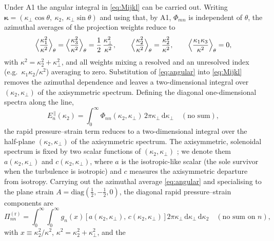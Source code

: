 \documentclass[lineno]{JFM-FLM_Au}
\begin{document}
Under A1 the angular integral in \eqref{eq:Mijkl} can be carried out. Writing
$\boldsymbol{\kappa}=(\kappa_\perp\cos\theta,\ \kappa_2,\
\kappa_\perp\sin\theta)$ and using that, by A1, $\Phi_{mn}$ is independent of
$\theta$, the azimuthal averages of the projection weights reduce to
\begin{equation}
  \Bigl\langle \frac{\kappa_1^2}{\kappa^2}\Bigr\rangle_\theta
  = \Bigl\langle \frac{\kappa_3^2}{\kappa^2}\Bigr\rangle_\theta
  = \frac{1}{2}\,\frac{\kappa_\perp^2}{\kappa^2},
  \qquad
  \Bigl\langle \frac{\kappa_2^2}{\kappa^2}\Bigr\rangle_\theta
  = \frac{\kappa_2^2}{\kappa^2},
  \qquad
  \Bigl\langle \frac{\kappa_1\kappa_3}{\kappa^2}\Bigr\rangle_\theta = 0,
  \label{eq:angular}
\end{equation}
with $\kappa^2=\kappa_2^2+\kappa_\perp^2$, and all weights mixing a resolved
and an unresolved index (e.g.\ $\kappa_1\kappa_2/\kappa^2$) averaging to zero.
Substitution of \eqref{eq:angular} into \eqref{eq:Mijkl} removes the azimuthal
dependence and leaves a two-dimensional integral over $(\kappa_2,\kappa_\perp)$
of the axisymmetric spectrum. Defining the diagonal one-dimensional spectra
along the line,
\begin{equation}
  E_n^{\,\|}(\kappa_2)
   = \int_0^\infty \Phi_{nn}(\kappa_2,\kappa_\perp)\,
     2\pi\kappa_\perp\,\mathrm{d}\kappa_\perp
   \quad(\text{no sum}),
   \label{eq:Epar}
\end{equation}
the rapid pressure--strain term reduces to a two-dimensional integral over the
half-plane $(\kappa_2,\kappa_\perp)$ of the axisymmetric spectrum. The
axisymmetric, solenoidal spectrum is fixed by two scalar functions of
$(\kappa_2,\kappa_\perp)$ \citep{Batchelor1946,ChandrasekharAxisym1950}; we
denote them $a(\kappa_2,\kappa_\perp)$ and $c(\kappa_2,\kappa_\perp)$, where
$a$ is the isotropic-like scalar (the sole survivor when the turbulence is
isotropic) and $c$ measures the axisymmetric departure from isotropy. Carrying
out the azimuthal average \eqref{eq:angular} and specialising to the plane
strain $A=\mathrm{diag}(\tfrac12,-\tfrac12,0)$, the diagonal rapid
pressure--strain components are
\begin{equation}
  \Pi^{(\mathrm r)}_{nn}
  = \int_{0}^{\infty}\!\!\int_{0}^{\infty}
      g_{n}(x)\,\bigl[\,a(\kappa_2,\kappa_\perp),\,c(\kappa_2,\kappa_\perp)\,\bigr]\,
      2\pi\kappa_\perp\,\mathrm{d}\kappa_\perp\,\mathrm{d}\kappa_2
   \quad(\text{no sum on }n),
  \label{eq:Piclosed}
\end{equation}
with $x\equiv\kappa_2^2/\kappa^2$, $\kappa^2=\kappa_2^2+\kappa_\perp^2$, and the
\end{document}
